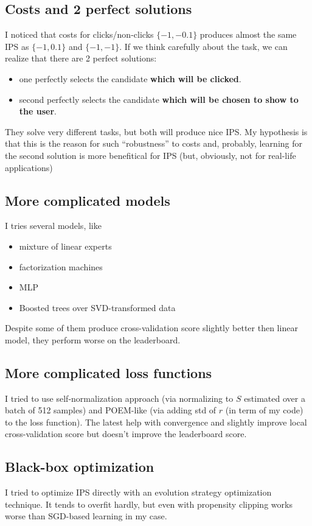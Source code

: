 \documentclass[12pt]{article}
\begin{document}
\subsection{Costs and 2 perfect solutions}
I noticed that costs for clicks/non-clicks $\{-1, -0.1\}$ produces almost the same IPS as $\{-1, 0.1\}$ and $\{-1, -1\}$. 
If we think carefully about the task, we can realize that there are 2 perfect solutions: 
\begin{itemize}
    \item one perfectly selects the candidate \textbf{which will be clicked}.
    \item second perfectly selects the candidate \textbf{which will be chosen to show to the user}.
\end{itemize}

They solve very different tasks, but both will produce nice IPS.
My hypothesis is that this is the reason for such ``robustness'' to costs and, probably, learning for the second solution is more benefitical for IPS (but, obviously, not for real-life applications)

\subsection{More complicated models}
I tries several models, like 
\begin{itemize}
    \item mixture of linear experts
    \item factorization machines
    \item MLP
    \item Boosted trees over SVD-transformed data
\end{itemize}

Despite some of them produce cross-validation score slightly better then linear model, they perform worse on the leaderboard.

\subsection{More complicated loss functions}
I tried to use self-normalization approach (via normalizing to $S$ estimated over a batch of 512 samples) and POEM-like (via adding std of $r$ (in term of my code) to the loss function). The latest help with convergence and slightly improve local cross-validation score but doesn't improve the leaderboard score.

\subsection{Black-box optimization}
I tried to optimize IPS directly with an evolution strategy optimization technique. It tends to overfit hardly, but even with propensity clipping works worse than SGD-based learning in my case.
\end{document}
